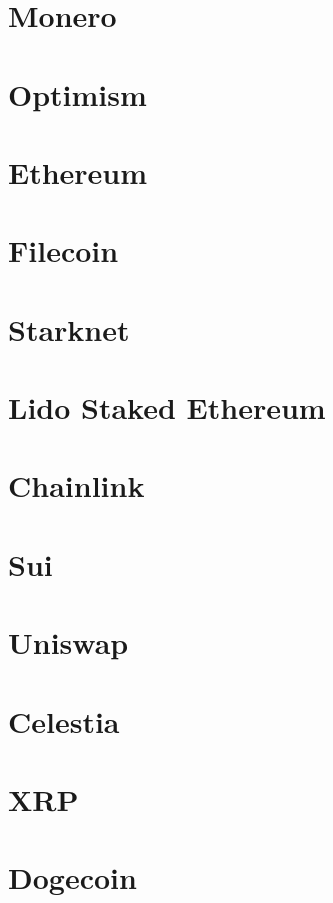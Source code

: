 \documentclass[
  letterpaper,
  DIV=11,
  numbers=noendperiod]{scrreprt}
\begin{document}
\section{Monero}\label{monero}

\section{Optimism}\label{optimism}

\section{Ethereum}\label{ethereum}

\section{Filecoin}\label{filecoin}

\section{Starknet}\label{starknet}

\section{Lido Staked Ethereum}\label{lido-staked-ethereum}

\section{Chainlink}\label{chainlink}

\section{Sui}\label{sui}

\section{Uniswap}\label{uniswap}

\section{Celestia}\label{celestia}

\section{XRP}\label{xrp}

\section{Dogecoin}\label{dogecoin}
\end{document}
